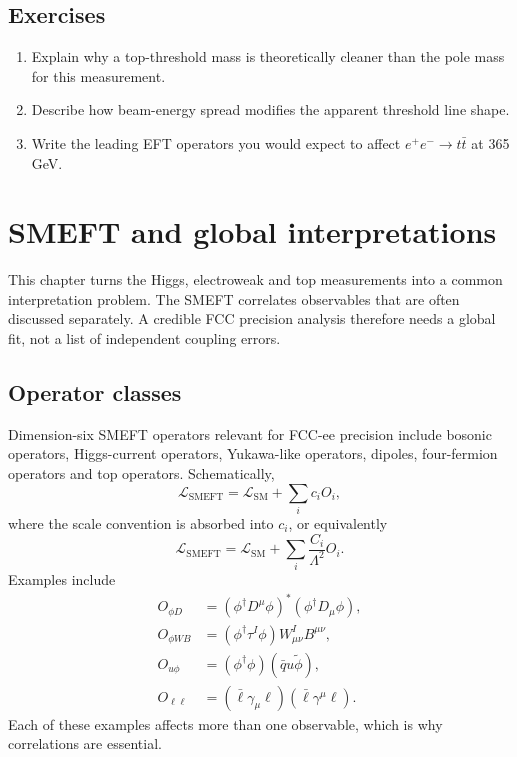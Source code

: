 \documentclass[11pt,a4paper]{article}
\newcommand{\Lag}{\mathcal{L}}
\newcommand{\SM}{\mathrm{SM}}
\newcommand{\SMEFT}{\mathrm{SMEFT}}
\numberwithin{equation}{section}
\begin{document}
\subsection{Exercises}
\begin{enumerate}[leftmargin=1.6em]
\item Explain why a top-threshold mass is theoretically cleaner than the pole mass for this measurement.
\item Describe how beam-energy spread modifies the apparent threshold line shape.
\item Write the leading EFT operators you would expect to affect \(e^+e^-\to t\bar t\) at 365 GeV.
\end{enumerate}


\newpage
\section{SMEFT and global interpretations}
\begin{guidelinebox}
This chapter turns the Higgs, electroweak and top measurements into a common interpretation problem. The SMEFT correlates observables that are often discussed separately. A credible FCC precision analysis therefore needs a global fit, not a list of independent coupling errors.
\end{guidelinebox}

\subsection{Operator classes}
Dimension-six SMEFT operators relevant for FCC-ee precision include bosonic operators, Higgs-current operators, Yukawa-like operators, dipoles, four-fermion operators and top operators. Schematically,
\begin{equation}
  \Lag_{\SMEFT}=\Lag_{\SM}+\sum_i c_iO_i,
\end{equation}
where the scale convention is absorbed into \(c_i\), or equivalently
\begin{equation}
  \Lag_{\SMEFT}=\Lag_{\SM}+\sum_i\frac{C_i}{\Lambda^2}O_i .
\end{equation}
Examples include
\begin{align}
  O_{\phi D}&=(\phi^\dagger D^\mu\phi)^*(\phi^\dagger D_\mu\phi),\\
  O_{\phi WB}&=(\phi^\dagger\tau^I\phi)W^I_{\mu\nu}B^{\mu\nu},\\
  O_{u\phi}&=(\phi^\dagger\phi)(\bar q u\tilde\phi),\\
  O_{\ell\ell}&=(\bar\ell\gamma_\mu\ell)(\bar\ell\gamma^\mu\ell).
\end{align}
Each of these examples affects more than one observable, which is why correlations are essential.
\end{document}
